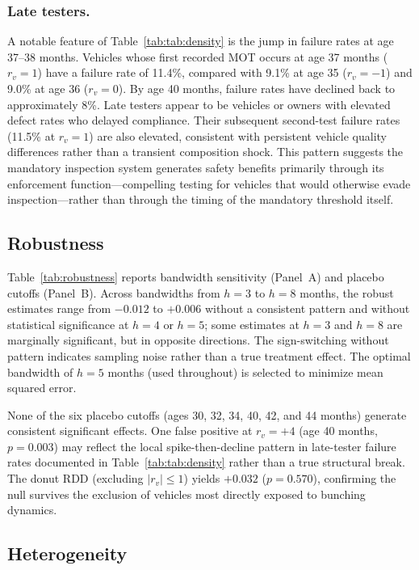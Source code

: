 \documentclass[12pt]{article}
\begin{document}
\subsubsection*{Late testers.}
A notable feature of Table~\ref{tab:tab:density} is the jump in failure rates at age 37--38 months. Vehicles whose first recorded MOT occurs at age 37 months ($r_v = 1$) have a failure rate of 11.4\%, compared with 9.1\% at age 35 ($r_v = -1$) and 9.0\% at age 36 ($r_v = 0$). By age 40 months, failure rates have declined back to approximately 8\%. Late testers appear to be vehicles or owners with elevated defect rates who delayed compliance. Their subsequent second-test failure rates (11.5\% at $r_v = 1$) are also elevated, consistent with persistent vehicle quality differences rather than a transient composition shock. This pattern suggests the mandatory inspection system generates safety benefits primarily through its enforcement function---compelling testing for vehicles that would otherwise evade inspection---rather than through the timing of the mandatory threshold itself.

\subsection{Robustness}

Table~\ref{tab:robustness} reports bandwidth sensitivity (Panel~A) and placebo cutoffs (Panel~B). Across bandwidths from $h = 3$ to $h = 8$ months, the robust estimates range from $-0.012$ to $+0.006$ without a consistent pattern and without statistical significance at $h = 4$ or $h = 5$; some estimates at $h = 3$ and $h = 8$ are marginally significant, but in opposite directions. The sign-switching without pattern indicates sampling noise rather than a true treatment effect. The optimal bandwidth of $h = 5$ months (used throughout) is selected to minimize mean squared error.



None of the six placebo cutoffs (ages 30, 32, 34, 40, 42, and 44 months) generate consistent significant effects. One false positive at $r_v = +4$ (age 40 months, $p = 0.003$) may reflect the local spike-then-decline pattern in late-tester failure rates documented in Table~\ref{tab:tab:density} rather than a true structural break. The donut RDD (excluding $|r_v| \leq 1$) yields $+0.032$ ($p = 0.570$), confirming the null survives the exclusion of vehicles most directly exposed to bunching dynamics.

\subsection{Heterogeneity}
\end{document}
